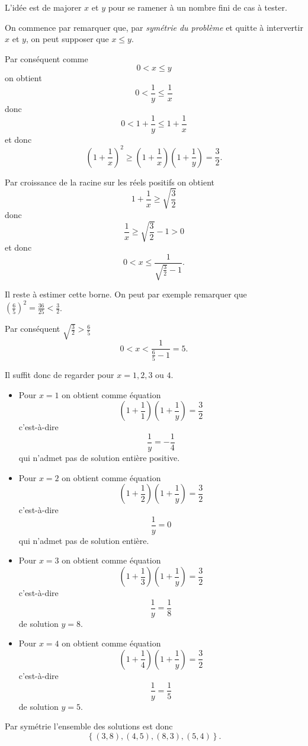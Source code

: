 \begin{sol}
L'idée est de majorer $x$ et $y$ pour se ramener à un nombre fini de cas à tester.

On commence par remarquer que, par \emph{symétrie du problème} et quitte à intervertir $x$ et $y$, on peut supposer que $x \leq y$.

Par conséquent comme
\[0 < x \leq y\]
on obtient
\[0 < \frac{1}{y} \leq \frac{1}{x}\]
donc
\[0 < 1+\frac{1}{y} \leq 1+\frac{1}{x}\]
et donc
\[\left(1 + \frac{1}{x} \right)^2 \geq \left( 1 + \frac{1}{x}\right) \left(1 + \frac{1}{y} \right) = \frac{3}{2}.\]

Par croissance de la racine sur les réels positifs on obtient
\[1 + \frac{1}{x} \geq \sqrt{\frac{3}{2}}\]
donc
\[\frac{1}{x} \geq \sqrt{\frac{3}{2}}-1 > 0\]
et donc
\[0 < x \leq \frac{1}{\sqrt{\frac{3}{2}}-1}.\]


Il reste à estimer cette borne. On peut par exemple remarquer que $\left( \frac{6}{5}\right)^2 = \frac{36}{25} < \frac{3}{2}$.

Par conséquent $\sqrt{\frac{3}{2}} > \frac{6}{5}$
\[0 < x < \frac{1}{\frac{6}{5}-1} = 5.\]

Il suffit donc de regarder pour $x =1, 2, 3 \text{ ou } 4$.

\begin{itemize}
	\item Pour $x=1$ on obtient comme équation
	\[\left(1 + \frac{1}{1} \right)\left(1 + \frac{1}{y} \right) = \frac{3}{2}\]
	c'est-à-dire
	\[\frac{1}{y} = -\frac{1}{4}\]
	qui n'admet pas de solution entière positive.
	\item Pour $x=2$ on obtient comme équation
	\[\left(1 + \frac{1}{2} \right)\left(1 + \frac{1}{y} \right) = \frac{3}{2}\]
	c'est-à-dire
	\[\frac{1}{y} = 0\]
	qui n'admet pas de solution entière.
	\item Pour $x=3$ on obtient comme équation
	\[\left(1 + \frac{1}{3} \right)\left(1 + \frac{1}{y} \right) = \frac{3}{2}\]
	c'est-à-dire
	\[\frac{1}{y} = \frac{1}{8}\]
	de solution $y=8$.
	\item Pour $x=4$ on obtient comme équation
	\[\left(1 + \frac{1}{4} \right)\left(1 + \frac{1}{y} \right) = \frac{3}{2}\]
	c'est-à-dire
	\[\frac{1}{y} = \frac{1}{5}\]
	de solution $y=5$.
\end{itemize}

Par symétrie l'ensemble des solutions est donc
\[\boxed{\left\lbrace (3,8), (4,5), (8,3), (5,4) \right\rbrace}.\]
\end{sol}


